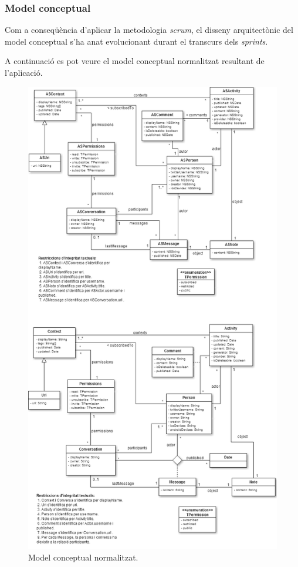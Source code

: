 
\subsubsection{Model conceptual}

Com a conseqüència d'aplicar la metodologia \textit{scrum}, el disseny arquitectònic del model conceptual s'ha anat evolucionant durant el transcurs dels \textit{sprints}. 

A continuació es pot veure el model conceptual normalitzat resultant de l'aplicació.



\begin{figure}[ht]
    \centering
    \includegraphics*[scale=0.6, viewport=0 800 806 1500]{Memoria/Especificacio/model_conceptual.png}
    \caption{Model conceptual normalitzat.}
    \label{fig:model_conceptual_normalitzat}
\end{figure}
\FloatBarrier